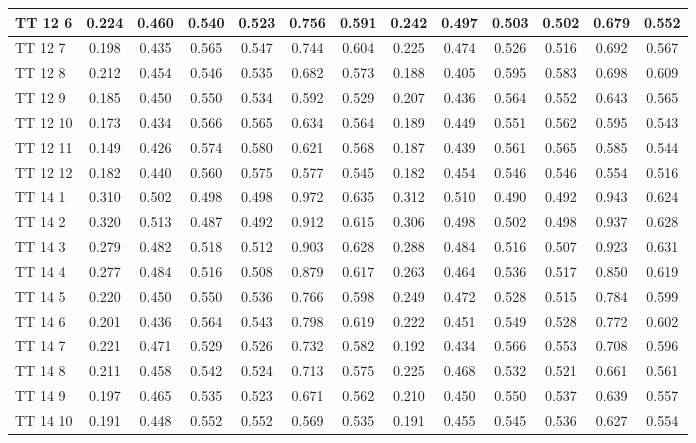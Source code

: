 \documentclass{article}
\begin{document}
\begin{tabular}{|l|c|c|c|c|c|c||c|c|c|c|c|c|}
TT 12  6 & 0.224 & 0.460 & 0.540 & 0.523 & 0.756 & 0.591 & 0.242 & 0.497 & 0.503 & 0.502 & 0.679 & 0.552\\ \hline
TT 12  7 & 0.198 & 0.435 & 0.565 & 0.547 & 0.744 & 0.604 & 0.225 & 0.474 & 0.526 & 0.516 & 0.692 & 0.567\\ \hline
TT 12  8 & 0.212 & 0.454 & 0.546 & 0.535 & 0.682 & 0.573 & 0.188 & 0.405 & 0.595 & 0.583 & 0.698 & 0.609\\ \hline
TT 12  9 & 0.185 & 0.450 & 0.550 & 0.534 & 0.592 & 0.529 & 0.207 & 0.436 & 0.564 & 0.552 & 0.643 & 0.565\\ \hline
TT 12 10 & 0.173 & 0.434 & 0.566 & 0.565 & 0.634 & 0.564 & 0.189 & 0.449 & 0.551 & 0.562 & 0.595 & 0.543\\ \hline
TT 12 11 & 0.149 & 0.426 & 0.574 & 0.580 & 0.621 & 0.568 & 0.187 & 0.439 & 0.561 & 0.565 & 0.585 & 0.544\\ \hline
TT 12 12 & 0.182 & 0.440 & 0.560 & 0.575 & 0.577 & 0.545 & 0.182 & 0.454 & 0.546 & 0.546 & 0.554 & 0.516\\ \hline
TT 14  1 & 0.310 & 0.502 & 0.498 & 0.498 & 0.972 & 0.635 & 0.312 & 0.510 & 0.490 & 0.492 & 0.943 & 0.624\\ \hline
TT 14  2 & 0.320 & 0.513 & 0.487 & 0.492 & 0.912 & 0.615 & 0.306 & 0.498 & 0.502 & 0.498 & 0.937 & 0.628\\ \hline
TT 14  3 & 0.279 & 0.482 & 0.518 & 0.512 & 0.903 & 0.628 & 0.288 & 0.484 & 0.516 & 0.507 & 0.923 & 0.631\\ \hline
TT 14  4 & 0.277 & 0.484 & 0.516 & 0.508 & 0.879 & 0.617 & 0.263 & 0.464 & 0.536 & 0.517 & 0.850 & 0.619\\ \hline
TT 14  5 & 0.220 & 0.450 & 0.550 & 0.536 & 0.766 & 0.598 & 0.249 & 0.472 & 0.528 & 0.515 & 0.784 & 0.599\\ \hline
TT 14  6 & 0.201 & 0.436 & 0.564 & 0.543 & 0.798 & 0.619 & 0.222 & 0.451 & 0.549 & 0.528 & 0.772 & 0.602\\ \hline
TT 14  7 & 0.221 & 0.471 & 0.529 & 0.526 & 0.732 & 0.582 & 0.192 & 0.434 & 0.566 & 0.553 & 0.708 & 0.596\\ \hline
TT 14  8 & 0.211 & 0.458 & 0.542 & 0.524 & 0.713 & 0.575 & 0.225 & 0.468 & 0.532 & 0.521 & 0.661 & 0.561\\ \hline
TT 14  9 & 0.197 & 0.465 & 0.535 & 0.523 & 0.671 & 0.562 & 0.210 & 0.450 & 0.550 & 0.537 & 0.639 & 0.557\\ \hline
TT 14 10 & 0.191 & 0.448 & 0.552 & 0.552 & 0.569 & 0.535 & 0.191 & 0.455 & 0.545 & 0.536 & 0.627 & 0.554\\ \hline

\end{tabular}
\end{document}
